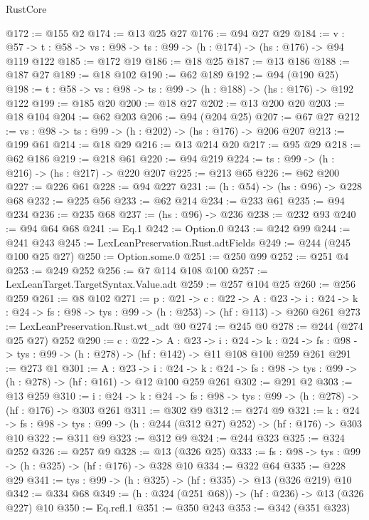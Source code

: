 \begin{lexlean}{RustCore}
\begin{coremodule}
@172 := @155 @2
@174 := @13 @25 @27
@176 := @94 @27 @29
@184 := {v : @57} ->
  {t : @58} -> {vs : @98} -> {ts : @99} -> (h : @174) -> (hs : @176) -> @94 @119 @122
@185 := @172 @19
@186 := @18 @25
@187 := @13 @186
@188 := @187 @27
@189 := @18 @102
@190 := @62 @189
@192 := @94 (@190 @25)
@198 := {t : @58} -> {vs : @98} -> {ts : @99} -> (h : @188) -> (hs : @176) -> @192 @122
@199 := @185 @20
@200 := @18 @27
@202 := @13 @200 @20
@203 := @18 @104
@204 := @62 @203
@206 := @94 (@204 @25)
@207 := @67 @27
@212 := {vs : @98} -> {ts : @99} -> (h : @202) -> (hs : @176) -> @206 @207
@213 := @199 @61
@214 := @18 @29
@216 := @13 @214 @20
@217 := @95 @29
@218 := @62 @186
@219 := @218 @61
@220 := @94 @219
@224 := {ts : @99} -> (h : @216) -> (hs : @217) -> @220 @207
@225 := @213 @65
@226 := @62 @200
@227 := @226 @61
@228 := @94 @227
@231 := (h : @54) -> (hs : @96) -> @228 @68
@232 := @225 @56
@233 := @62 @214
@234 := @233 @61
@235 := @94 @234
@236 := @235 @68
@237 := (hs : @96) -> @236
@238 := @232 @93
@240 := @94 @64 @68
@241 := Eq.{1}
@242 := Option.{0}
@243 := @242 @99
@244 := @241 @243
@245 := LexLeanPreservation.Rust.adtFields
@249 := @244 (@245 @100 @25 @27)
@250 := Option.some.{0}
@251 := @250 @99
@252 := @251 @4
@253 := @249 @252
@256 := @7 @114 @108 @100
@257 := LexLeanTarget.TargetSyntax.Value.adt
@259 := @257 @104 @25
@260 := @256 @259
@261 := @8 @102
@271 := {p : @21} ->
  {c : @22} ->
  {A : @23} ->
  {i : @24} -> {k : @24} -> {fs : @98} -> {tys : @99} -> (h : @253) -> (hf : @113) -> @260 @261
@273 := LexLeanPreservation.Rust.wt_adt @0
@274 := @245 @0
@278 := @244 (@274 @25 @27) @252
@290 := {c : @22} ->
  {A : @23} ->
  {i : @24} ->
  {k : @24} -> {fs : @98} -> {tys : @99} -> (h : @278) -> (hf : @142) -> @11 @108 @100 @259 @261
@291 := @273 @1
@301 := {A : @23} ->
  {i : @24} ->
  {k : @24} -> {fs : @98} -> {tys : @99} -> (h : @278) -> (hf : @161) -> @12 @100 @259 @261
@302 := @291 @2
@303 := @13 @259
@310 := {i : @24} ->
  {k : @24} -> {fs : @98} -> {tys : @99} -> (h : @278) -> (hf : @176) -> @303 @261
@311 := @302 @9
@312 := @274 @9
@321 := {k : @24} ->
  {fs : @98} -> {tys : @99} -> (h : @244 (@312 @27) @252) -> (hf : @176) -> @303 @10
@322 := @311 @9
@323 := @312 @9
@324 := @244 @323
@325 := @324 @252
@326 := @257 @9
@328 := @13 (@326 @25)
@333 := {fs : @98} -> {tys : @99} -> (h : @325) -> (hf : @176) -> @328 @10
@334 := @322 @64
@335 := @228 @29
@341 := {tys : @99} -> (h : @325) -> (hf : @335) -> @13 (@326 @219) @10
@342 := @334 @68
@349 := (h : @324 (@251 @68)) -> (hf : @236) -> @13 (@326 @227) @10
@350 := Eq.refl.{1}
@351 := @350 @243
@353 := @342 (@351 @323)

\end{coremodule}
\end{lexlean}
